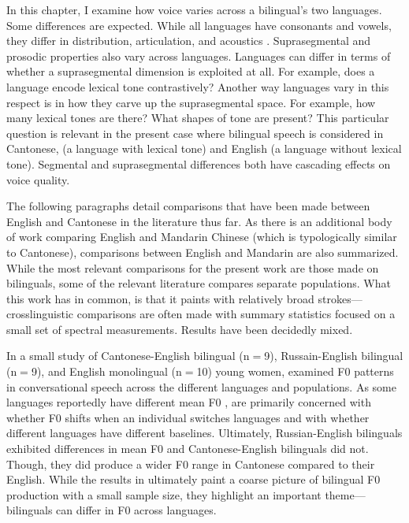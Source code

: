 In this chapter, I examine how voice varies across a bilingual's two languages. Some differences are expected. While all languages have consonants and vowels, they differ in distribution, articulation, and acoustics . Suprasegmental and prosodic properties also vary across languages. Languages can differ in terms of whether a suprasegmental dimension is exploited at all. For example, does a language encode lexical tone contrastively? Another way languages vary in this respect is in how they carve up the suprasegmental space. For example, how many lexical tones are there? What shapes of tone are present? This particular question is relevant in the present case where bilingual speech is considered in Cantonese, (a language with lexical tone) and English (a language without lexical tone). Segmental and suprasegmental differences both have cascading effects on voice quality. 

The following paragraphs detail comparisons that have been made between English and Cantonese in the literature thus far. As there is an additional body of work comparing English and Mandarin Chinese (which is typologically similar to Cantonese), comparisons between English and Mandarin are also summarized. While the most relevant comparisons for the present work are those made on bilinguals, some of the relevant literature compares separate populations. What this work has in common, is that it paints with relatively broad strokes---crosslinguistic comparisons are often made with summary statistics focused on a small set of spectral measurements. Results have been decidedly mixed. 

In a small study of Cantonese-English bilingual (n$=$9), Russain-English bilingual (n$=$9), and English monolingual (n$=$10) young women, \citet{altenberg_2006_f0} examined F0 patterns in conversational speech across the different languages and populations. As some languages reportedly have different mean F0 \citep[e.g.,][]{keating_2012_f0}, \citet{altenberg_2006_f0} are primarily concerned with whether F0 shifts when an individual switches languages and with whether different languages have different baselines. Ultimately, Russian-English bilinguals exhibited differences in mean F0 and Cantonese-English bilinguals did not. Though, they did produce a wider F0 range in Cantonese compared to their English. While the results in \citet{altenberg_2006_f0} ultimately paint a coarse picture of bilingual F0 production with a small sample size, they highlight an important theme---bilinguals can differ in F0 across languages. 

